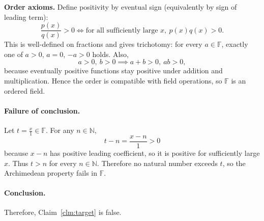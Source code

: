 \documentclass[11pt]{article}
\begin{document}
\textbf{Order axioms.}
Define positivity by eventual sign (equivalently by sign of leading term):
\[
\frac{p(x)}{q(x)}>0
\iff
\text{for all sufficiently large }x,\ p(x)q(x)>0.
\]
This is well-defined on fractions and gives trichotomy: for every $a\in\mathbb{F}$, exactly one of $a>0$, $a=0$, $-a>0$ holds.
Also,
\[
a>0,\ b>0\implies a+b>0,\ ab>0,
\]
because eventually positive functions stay positive under addition and multiplication. Hence the order is compatible with field operations, so $\mathbb{F}$ is an ordered field.

\paragraph{Failure of conclusion.}
Let $t=\frac{x}{1}\in\mathbb{F}$. For any $n\in\mathbb{N}$,
\[
t-n=\frac{x-n}{1}>0
\]
because $x-n$ has positive leading coefficient, so it is positive for sufficiently large $x$.
Thus $t>n$ for every $n\in\mathbb{N}$. Therefore no natural number exceeds $t$, so the Archimedean property fails in $\mathbb{F}$.

\paragraph{Conclusion.}
Therefore, Claim~\ref{clm:target} is false.
\end{document}
